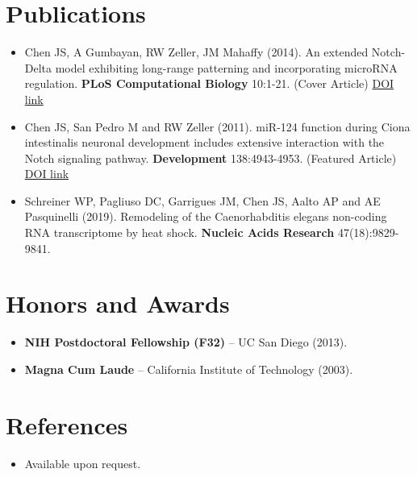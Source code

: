 \documentclass[11pt,a4paper,sans]{moderncv}
\begin{document}
\section{Publications}
\vspace{1pt}
\begin{itemize}
\item Chen JS, A Gumbayan, RW Zeller, JM Mahaffy (2014). An extended Notch-Delta model exhibiting long-range patterning and incorporating microRNA regulation. \textbf{PLoS Computational Biology} 10:1-21. (Cover Article) \href{http://www.ploscompbiol.org/article/info:doi/10.1371/journal.pcbi.1003655}{DOI link}
\item Chen JS, San Pedro M and RW Zeller (2011). miR-124 function during Ciona intestinalis neuronal development includes extensive interaction with the Notch signaling pathway. \textbf{Development} 138:4943-4953. (Featured Article) \href{http://dev.biologists.org/content/138/22/4943.full}{DOI link}
\item Schreiner WP, Pagliuso DC, Garrigues JM, Chen JS, Aalto AP and AE Pasquinelli (2019). Remodeling of the Caenorhabditis elegans non-coding RNA transcriptome by heat shock. \textbf{Nucleic Acids Research} 47(18):9829-9841.
\end{itemize}


\section{Honors and Awards}
\vspace{1pt}
\begin{itemize}
\item{\textbf{NIH Postdoctoral Fellowship (F32)} -- UC San Diego (2013).}
\item{\textbf{Magna Cum Laude} -- California Institute of Technology (2003).}
\end{itemize}


\section{References}
\vspace{1pt}
\begin{itemize}
\item{Available upon request.}
\end{itemize}
\end{document}
